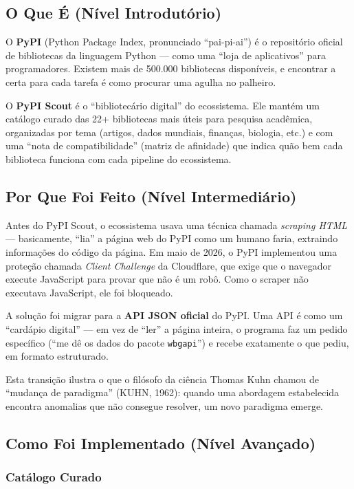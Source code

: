 \documentclass[12pt,a4paper]{article}
\begin{document}
\subsection{O Que É (Nível Introdutório)}

O \textbf{PyPI} (Python Package Index, pronunciado ``pai-pi-ai'') é o repositório oficial de bibliotecas da linguagem Python --- como uma ``loja de aplicativos'' para programadores. Existem mais de 500.000 bibliotecas disponíveis, e encontrar a certa para cada tarefa é como procurar uma agulha no palheiro.

O \textbf{PyPI Scout} é o ``bibliotecário digital'' do ecossistema. Ele mantém um catálogo curado das 22+ bibliotecas mais úteis para pesquisa acadêmica, organizadas por tema (artigos, dados mundiais, finanças, biologia, etc.) e com uma ``nota de compatibilidade'' (matriz de afinidade) que indica quão bem cada biblioteca funciona com cada pipeline do ecossistema.

\subsection{Por Que Foi Feito (Nível Intermediário)}

Antes do PyPI Scout, o ecossistema usava uma técnica chamada \textit{scraping HTML} --- basicamente, ``lia'' a página web do PyPI como um humano faria, extraindo informações do código da página. Em maio de 2026, o PyPI implementou uma proteção chamada \textit{Client Challenge} da Cloudflare, que exige que o navegador execute JavaScript para provar que não é um robô. Como o scraper não executava JavaScript, ele foi bloqueado.

A solução foi migrar para a \textbf{API JSON oficial} do PyPI. Uma API é como um ``cardápio digital'' --- em vez de ``ler'' a página inteira, o programa faz um pedido específico (``me dê os dados do pacote \texttt{wbgapi}'') e recebe exatamente o que pediu, em formato estruturado.

Esta transição ilustra o que o filósofo da ciência Thomas Kuhn chamou de ``mudança de paradigma'' (KUHN, 1962): quando uma abordagem estabelecida encontra anomalias que não consegue resolver, um novo paradigma emerge.

\subsection{Como Foi Implementado (Nível Avançado)}

\subsubsection{Catálogo Curado}
\end{document}
